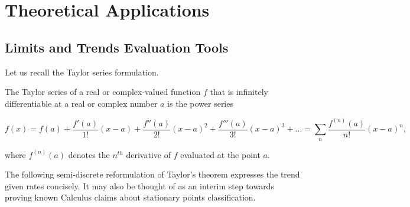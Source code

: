 \documentclass[11pt]{book}
\begin{document}
\section{Theoretical Applications}
\subsection{Limits and Trends Evaluation Tools}

Let us recall the Taylor series formulation.
\begin{theorem}The Taylor series of a real or complex-valued function $f$ that is infinitely differentiable at a real or complex number $a$ is the power series

$$f\left(x\right)=f\left(a\right)+\frac{f'\left(a\right)}{1!}\left(x-a\right)+\frac{f''\left(a\right)}{2!}\left(x-a\right)^{2}+\frac{f'''\left(a\right)}{3!}\left(x-a\right)^{3}+\ldots=\underset{n}{\sum}\frac{f^{\left(n\right)}\left(a\right)}{n!}\left(x-a\right)^{n},$$

where $f^{\left(n\right)}\left(a\right)$ denotes the $n^{th}$ derivative of $f$ evaluated at the point $a$.
\label{taylor_series}
\end{theorem}
The following semi-discrete reformulation of Taylor's theorem expresses the trend given rates concisely. It may also be thought of as an interim step towards proving known Calculus claims about stationary points classification.
\end{document}
